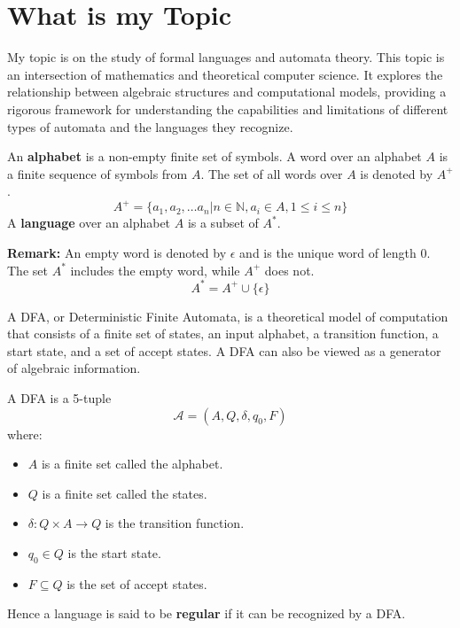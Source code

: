 \section{What is my Topic}
My topic is on the study of formal languages and automata theory. This topic is an intersection of mathematics and theoretical computer science. It explores the relationship between
algebraic structures and computational models, providing a rigorous framework for understanding the capabilities and limitations of different types of automata and the languages they recognize.
\vspace{5pt}
\begin{definition*}
    An {\bf alphabet} is a non-empty finite set of symbols. A word over an alphabet $A$ is a finite sequence of symbols from $A$. The set of all words over $A$ is denoted by $A^+$. 
    $$A^{+} = \{a_1, a_2, \ldots a_n | n \in \mathbb{N}, a_i \in A, 1 \leq i \leq n\}$$
    A {\bf language} over an alphabet $A$ is a subset of $A^*$.
\end{definition*}

{\bf Remark:} An empty word is denoted by $\epsilon$ and is the unique word of length 0. The set $A^*$ includes the empty word, while $A^+$ does not.
$$A^{*} = A^{+} \cup \{\epsilon\}$$

A DFA, or Deterministic Finite Automata, is a theoretical model of computation that consists of a finite set of states, an input alphabet, a transition function, a start state, and a set of accept states. A DFA can also be viewed as a generator of algebraic information.

\begin{definition*}
    A DFA is a 5-tuple 
    $$\mathscr{A} = (A, Q, \delta, q_0, F)$$ where:
    \begin{itemize}
        \item $A$ is a finite set called the alphabet.
        \item $Q$ is a finite set called the states.
        \item $\delta: Q \times A \rightarrow Q$ is the transition function.
        \item $q_0 \in Q$ is the start state.
        \item $F \subseteq Q$ is the set of accept states.
    \end{itemize}
\end{definition*}

Hence a language is said to be {\bf regular} if it can be recognized by a DFA.

